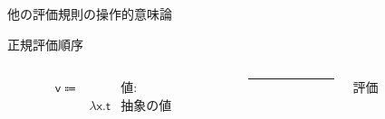 \documentclass[9pt]{beamer}
\begin{document}
\begin{frame}{他の評価規則の操作的意味論}
    \begin{block}{正規評価順序}
    \begin{columns}
        \begin{column}{0.48\textwidth}
            \begin{align*}
            \mathsf{v}\Coloneq& &\text{値:}\\
                &\lambda \mathsf{x}.\mathsf{t}&\text{抽象の値}&
            \end{align*}
        \end{column}
        \begin{column}{.02\textwidth}
            \rule{.1mm}{0.5\textheight}
        \end{column}
        \begin{column}{0.48\textwidth}
            評価
            \begin{prooftree}
            \end{prooftree}
            \begin{prooftree}
            \end{prooftree}
            \begin{prooftree}
            \end{prooftree}
        \end{column}
    \end{columns}
    \end{block}
    \end{frame}
\end{document}
